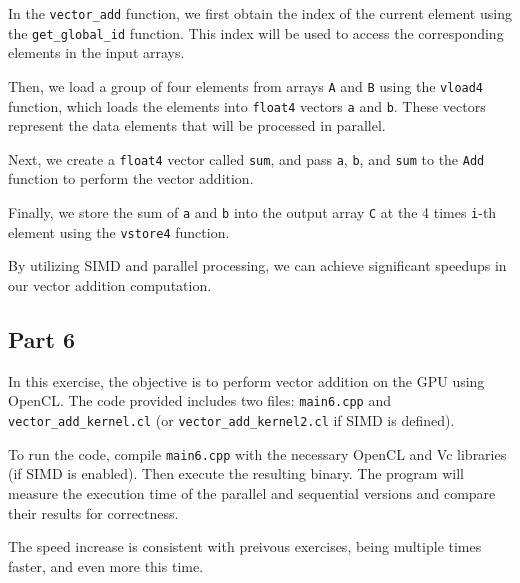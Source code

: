 \documentclass{article}
\begin{document}
In the \texttt{vector\_add} function, we first obtain the index of the current element using the \texttt{get\_global\_id} function. This index will be used to access the corresponding elements in the input arrays.

Then, we load a group of four elements from arrays \texttt{A} and \texttt{B} using the \texttt{vload4} function, which loads the elements into \texttt{float4} vectors \texttt{a} and \texttt{b}. These vectors represent the data elements that will be processed in parallel.

Next, we create a \texttt{float4} vector called \texttt{sum}, and pass \texttt{a}, \texttt{b}, and \texttt{sum} to the \texttt{Add} function to perform the vector addition.

Finally, we store the sum of \texttt{a} and \texttt{b} into the output array \texttt{C} at the 4 times \texttt{i}-th element using the \texttt{vstore4} function.

By utilizing SIMD and parallel processing, we can achieve significant speedups in our vector addition computation.

\subsection*{Part 6}

In this exercise, the objective is to perform vector addition on the GPU using OpenCL. The code provided includes two files: \texttt{main6.cpp} and \texttt{vector\_add\_kernel.cl} (or \texttt{vector\_add\_kernel2.cl} if SIMD is defined).

To run the code, compile \texttt{main6.cpp} with the necessary OpenCL and Vc libraries (if SIMD is enabled). Then execute the resulting binary. The program will measure the execution time of the parallel and sequential versions and compare their results for correctness.

The speed increase is consistent with preivous exercises, being multiple times faster, and even more this time.
\end{document}

